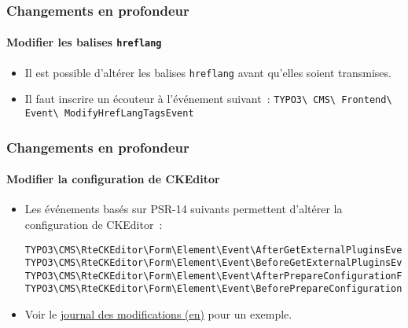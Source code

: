 
\begin{frame}[fragile]
	\frametitle{Changements en profondeur}
	\framesubtitle{Modifier les balises \texttt{hreflang}}

	\lstset{basicstyle=\smaller\ttfamily}

	\begin{itemize}
		\item Il est possible d'altérer les balises \texttt{hreflang} avant qu'elles soient transmises.
		\item Il faut inscrire un écouteur à l'événement suivant~:\newline
			\smaller
				\texttt{TYPO3\textbackslash
					CMS\textbackslash
					Frontend\textbackslash
					Event\textbackslash
					ModifyHrefLangTagsEvent}
			\normalsize
	\end{itemize}

\end{frame}


\begin{frame}[fragile]
	\frametitle{Changements en profondeur}
	\framesubtitle{Modifier la configuration de CKEditor}

	\lstset{basicstyle=\tiny\ttfamily}

	\begin{itemize}
		\item Les événements basés sur PSR-14 suivants permettent d'altérer la configuration de CKEditor~:
\begin{lstlisting}
TYPO3\CMS\RteCKEditor\Form\Element\Event\AfterGetExternalPluginsEvent
TYPO3\CMS\RteCKEditor\Form\Element\Event\BeforeGetExternalPluginsEvent
TYPO3\CMS\RteCKEditor\Form\Element\Event\AfterPrepareConfigurationForEditorEvent
TYPO3\CMS\RteCKEditor\Form\Element\Event\BeforePrepareConfigurationForEditorEvent
\end{lstlisting}

		\item Voir le
			\href{https://docs.typo3.org/c/typo3/cms-core/master/en-us/Changelog/10.3/Feature-88818-IntroduceEventsToModifyCKEditorConfiguration.html}{journal des modifications (en)}
			pour un exemple.
	\end{itemize}

\end{frame}

